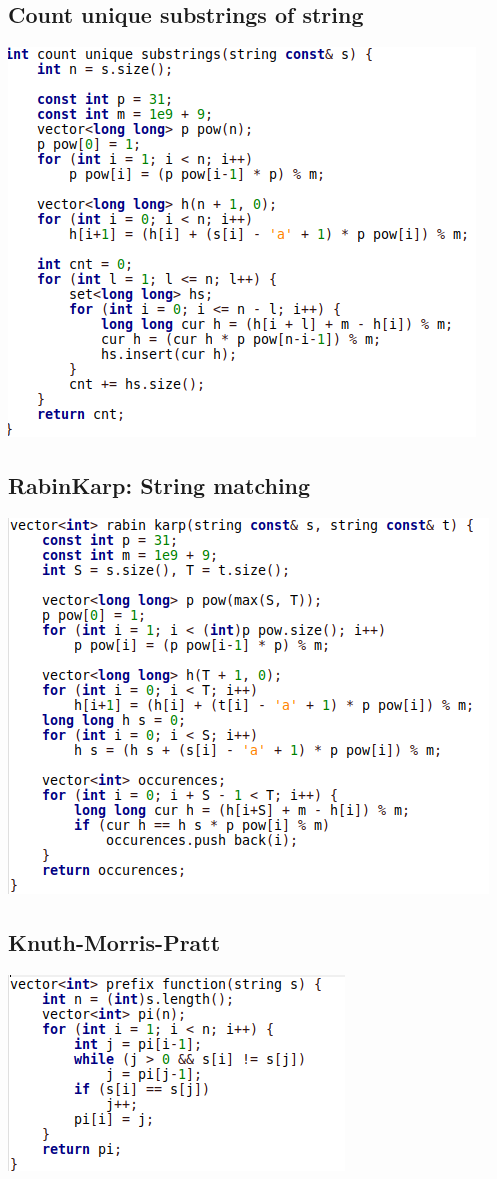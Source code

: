 \documentclass[11pt,twocolumn]{article}
\begin{document}
\subsection{Count unique substrings of string}
\includegraphics[scale=0.5]{uniquesubstrings}

\subsection{RabinKarp: String matching}
\includegraphics[scale=0.5]{rabinkarp}

\subsection{Knuth-Morris-Pratt}
\includegraphics[scale=0.5]{kmp}
\end{document}
